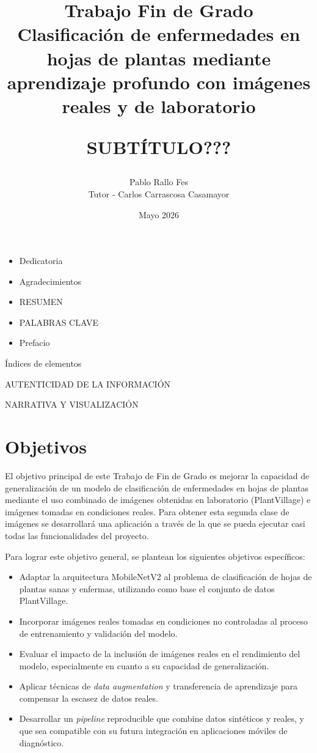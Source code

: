 \documentclass[12pt,a4paper]{article}
\title{Trabajo Fin de Grado\\
Clasificación de enfermedades en hojas de plantas mediante aprendizaje profundo con imágenes reales y de laboratorio

SUBTÍTULO???}
\author{Pablo Rallo Fes\\
Tutor - Carlos Carrascosa Casamayor}
\date{Mayo 2026}
\begin{document}
\maketitle

\begin{itemize}
    \item Dedicatoria
    \item Agradecimientos
    \item RESUMEN
    \item PALABRAS CLAVE
    \item Prefacio
\end{itemize}

\newpage
\tableofcontents

Índices de elementos

AUTENTICIDAD DE LA INFORMACIÓN

NARRATIVA Y VISUALIZACIÓN


\newpage

\section{Objetivos}

El objetivo principal de este Trabajo de Fin de Grado es mejorar la capacidad de generalización de un modelo de clasificación de enfermedades en hojas de plantas mediante el uso combinado de imágenes obtenidas en laboratorio (PlantVillage) e imágenes tomadas en condiciones reales. Para obtener esta segunda clase de imágenes se desarrollará una aplicación a través de la que se pueda ejecutar casi todas las funcionalidades del proyecto.

Para lograr este objetivo general, se plantean los siguientes objetivos específicos:

\begin{itemize}
    \item Adaptar la arquitectura MobileNetV2 al problema de clasificación de hojas de plantas sanas y enfermas, utilizando como base el conjunto de datos PlantVillage.
    \item Incorporar imágenes reales tomadas en condiciones no controladas al proceso de entrenamiento y validación del modelo.
    \item Evaluar el impacto de la inclusión de imágenes reales en el rendimiento del modelo, especialmente en cuanto a su capacidad de generalización.
    \item Aplicar técnicas de \textit{data augmentation} y transferencia de aprendizaje para compensar la escasez de datos reales.
    \item Desarrollar un \textit{pipeline} reproducible que combine datos sintéticos y reales, y que sea compatible con su futura integración en aplicaciones móviles de diagnóstico.
\end{itemize}
\end{document}
